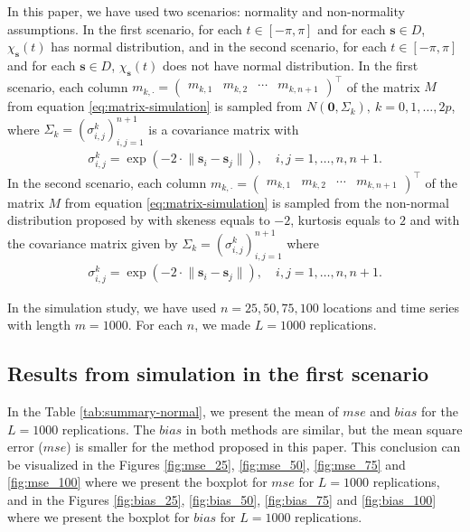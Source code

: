\documentclass[12pt]{interact}
\theoremstyle{plain}%
\theoremstyle{definition}
\theoremstyle{remark}
\begin{document}
In this paper, we have used two scenarios: normality and non-normality assumptions. In the first scenario, for each \(t \in [-\pi, \pi]\) and for each \(\bm{s} \in D\), \(\chi_{\bm{s}}(t)\) has normal distribution, and in the second scenario, for each \(t \in [-\pi, \pi]\) and for each \(\bm{s} \in D\), \(\chi_{\bm{s}}(t)\) does not have normal distribution. In the first scenario, each column \(m_{k,\cdot} = \begin{pmatrix} m_{k,1} & m_{k,2} & \cdots & m_{k,n+1} \end{pmatrix}^\top\) of the matrix \(M\) from equation \eqref{eq:matrix-simulation} is sampled from \(N(\bm{0}, \Sigma_k),\ k=0,1,\dots, 2p\), where \(\Sigma_k = (\sigma_{i,j}^k)_{i,j=1}^{n+1}\) is a covariance matrix with
\begin{align*}
\sigma_{i,j}^k = \exp \left( -2 \cdot \lVert \bm{s}_i - \bm{s}_j \rVert \right), \quad i,j=1, \dots, n, n+1.
\end{align*}
In the second scenario, each column \(m_{k,\cdot} = \begin{pmatrix} m_{k,1} & m_{k,2} & \cdots & m_{k,n+1} \end{pmatrix}^\top\) of the matrix \(M\) from equation \eqref{eq:matrix-simulation} is sampled from the non-normal distribution proposed by \citet{Vale1983} with skeness equals to \(-2\), kurtosis equals to \(2\) and with the covariance matrix given by \(\Sigma_k = (\sigma_{i,j}^k)_{i,j=1}^{n+1}\) where
\begin{align*}
\sigma_{i,j}^k = \exp \left( -2 \cdot \lVert \bm{s}_i - \bm{s}_j \rVert \right), \quad i,j=1, \dots, n, n+1.
\end{align*}

In the simulation study, we have used \(n=25,50,75,100\) locations and time series with length \(m=1000\). For each \(n\), we made \(L=1000\) replications.

\subsection*{Results from simulation in the first scenario}\label{results-from-simulation-in-the-first-scenario}

In the Table \ref{tab:summary-normal}, we present the mean of \(mse\) and \(bias\) for the \(L=1000\) replications. The \(bias\) in both methods are similar, but the mean square error (\(mse\)) is smaller for the method proposed in this paper. This conclusion can be visualized in the Figures \ref{fig:mse_25}, \ref{fig:mse_50}, \ref{fig:mse_75} and \ref{fig:mse_100} where we present the boxplot for \(mse\) for \(L=1000\) replications, and in the Figures \ref{fig:bias_25}, \ref{fig:bias_50}, \ref{fig:bias_75} and \ref{fig:bias_100} where we present the boxplot for \(bias\) for \(L=1000\) replications.
\end{document}
